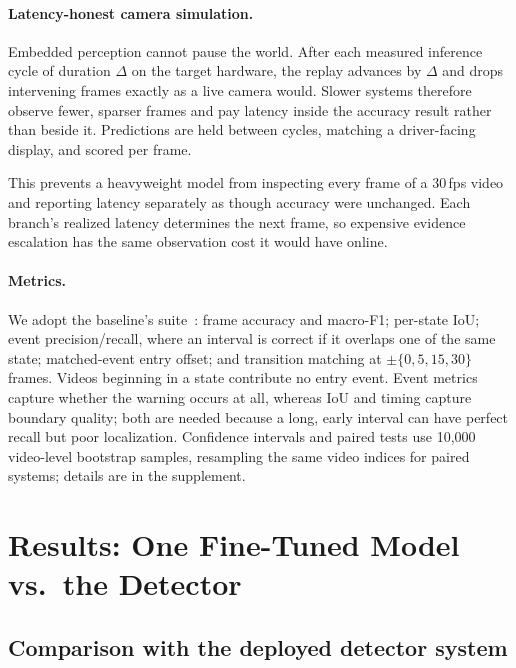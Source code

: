 \documentclass[10pt,twocolumn,letterpaper]{article}
\begin{document}
\paragraph{Latency-honest camera simulation.} Embedded perception cannot pause the world.  After each measured inference cycle of duration $\Delta$ on the target hardware, the replay advances by $\Delta$ and drops intervening frames exactly as a live camera would.  Slower systems therefore observe fewer, sparser frames and pay latency inside the accuracy result rather than beside it.  Predictions are held between cycles, matching a driver-facing display, and scored per frame.

This prevents a heavyweight model from inspecting every frame of a 30\,fps video and reporting latency separately as though accuracy were unchanged.  Each branch's realized latency determines the next frame, so expensive evidence escalation has the same observation cost it would have online.

\paragraph{Metrics.} We adopt the baseline's suite~\cite{priorsystem2026}: frame accuracy and macro-F1; per-state IoU; event precision/recall, where an interval is correct if it overlaps one of the same state; matched-event entry offset; and transition matching at $\pm\{0,5,15,30\}$ frames.  Videos beginning in a state contribute no entry event.  Event metrics capture whether the warning occurs at all, whereas IoU and timing capture boundary quality; both are needed because a long, early interval can have perfect recall but poor localization.  Confidence intervals and paired tests use 10{,}000 video-level bootstrap samples, resampling the same video indices for paired systems; details are in the supplement.

\section{Results: One Fine-Tuned Model vs.\ the Detector}
\label{sec:results}

\subsection{Comparison with the deployed detector system}
\label{sec:vsdetector}
\end{document}
